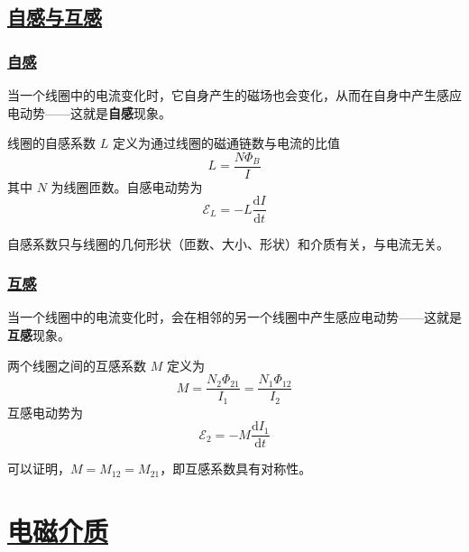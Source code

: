\subsection{\protect\hyperlink{:}{自感与互感}}

\subsubsection{\protect\hyperlink{:}{自感}}

当一个线圈中的电流变化时，它自身产生的磁场也会变化，从而在自身中产生感应电动势——这就是\textbf{自感}现象。

\begin{definition}[自感系数]
    线圈的自感系数 $L$ 定义为通过线圈的磁通链数与电流的比值
    \begin{equation}
        L = \frac{N\Phi_B}{I}
    \end{equation}
    其中 $N$ 为线圈匝数。自感电动势为
    \begin{equation}
        \mathcal{E}_L = -L\frac{\mathrm{d}I}{\mathrm{d}t}
    \end{equation}
\end{definition}

自感系数只与线圈的几何形状（匝数、大小、形状）和介质有关，与电流无关。

\subsubsection{\protect\hyperlink{:}{互感}}

当一个线圈中的电流变化时，会在相邻的另一个线圈中产生感应电动势——这就是\textbf{互感}现象。

\begin{definition}[互感系数]
    两个线圈之间的互感系数 $M$ 定义为
    \begin{equation}
        M = \frac{N_2 \Phi_{21}}{I_1} = \frac{N_1 \Phi_{12}}{I_2}
    \end{equation}
    互感电动势为
    \begin{equation}
        \mathcal{E}_2 = -M\frac{\mathrm{d}I_1}{\mathrm{d}t}
    \end{equation}
\end{definition}

可以证明，$M = M_{12} = M_{21}$，即互感系数具有对称性。


\newpage
\section{\protect\hyperlink{:}{电磁介质}}


